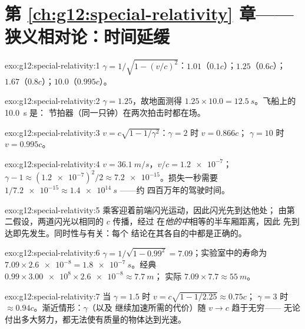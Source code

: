 \section*{第 \ref{ch:g12:special-relativity} 章——狭义相对论：时间延缓}

\begin{solution}{exo:g12:special-relativity:1}
$\gamma = 1/\sqrt{1 - (v/c)^2}$：$1.01$（$0.1c$）；$1.25$（$0.6c$）；
$1.67$（$0.8c$）；$10.0$（$0.995c$）。
\end{solution}

\begin{solution}{exo:g12:special-relativity:2}
$\gamma = 1.25$，故地面测得 $1.25 \times 10.0 =
\qty{12.5}{s}$。飞船上的 \qty{10.0}{s} 是：
节拍器（同一只钟）在两次拍击时都在场。
\end{solution}

\begin{solution}{exo:g12:special-relativity:3}
$v = c\sqrt{1 - 1/\gamma^2}$：$\gamma = 2$ 时 $v = 0.866c$；
$\gamma = 10$ 时 $v = 0.995c$。
\end{solution}

\begin{solution}{exo:g12:special-relativity:4}
$v = \qty{36.1}{m/s}$，$v/c = \num{1.2e-7}$；
$\gamma - 1 \approx (\num{1.2e-7})^2/2 \approx \num{7.2e-15}$。损失一秒需要
$1/\num{7.2e-15} \approx \qty{1.4e14}{s}$ ——约
四百万年的驾驶时间。
\end{solution}

\begin{solution}{exo:g12:special-relativity:5}
乘客迎着前端闪光运动，因此闪光先到达他处；
由第二假设，两道闪光以相同的 $c$ 传播，经过
在\emph{他的中}相等的半车厢距离，因此
先到达即先发生。同时性与有关：每个
结论在其各自的中都是正确的。
\end{solution}

\begin{solution}{exo:g12:special-relativity:6}
$\gamma = 1/\sqrt{1 - 0.99^2} = 7.09$；实验室中的寿命为
$7.09 \times \num{2.6e-8} = \qty{1.8e-7}{s}$。经典
$0.99 \times \num{3.00e8} \times \num{2.6e-8} \approx \qty{7.7}{m}$；
实际 $7.09 \times 7.7 \approx \qty{55}{m}$。
\end{solution}

\begin{solution}{exo:g12:special-relativity:7}
当 $\gamma = 1.5$ 时 $v = c\sqrt{1 - 1/2.25} \approx 0.75c$；
$\gamma = 3$ 时 $\approx 0.94c$。渐近情形：$\gamma$（以及
继续加速所需的代价）随 $v \to c$ 趋于无穷——
无论付出多大努力，都无法使有质量的物体达到光速。
\end{solution}

